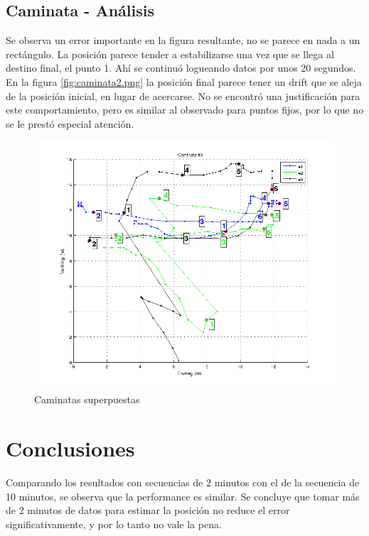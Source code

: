 \documentclass[spanish,12pt,a4paper,titlepage]{report}
\begin{document}
\subsection{Caminata - Análisis}
\label{sec:caminata-analisis}

Se observa un error importante en la figura resultante, no se parece en nada a un rectángulo. La posición parece tender a estabilizarse una vez que se llega al destino final, el punto 1. Ahí se continuó logueando datos por unos 20 segundos. En la figura \ref{fig:caminata2.png} la posición final parece tener un drift que se aleja de la posición inicial, en lugar de acercarse. No se encontró una justificación para este comportamiento, pero es similar al observado para puntos fijos, por lo que no se le prestó especial atención.

\begin{figure}[h!]
  \includegraphics[width=1\textwidth]{./img/caminatas.png}
  \caption{Caminatas superpuestas}
  \label{fig:caminatas.png}
\end{figure}


\newpage
\section{Conclusiones}
\label{sec:conclusion}

Comparando los resultados con secuencias de 2 minutos con el de la secuencia de 10 minutos, se observa que la performance es similar. Se concluye que tomar más de 2 minutos de datos para estimar la posición no reduce el error significativamente, y por lo tanto no vale la pena.
\end{document}

